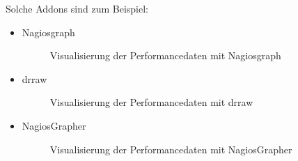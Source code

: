 Solche Addons sind zum Beispiel:
\begin{itemize}
\item Nagiosgraph 

\begin{figure}[ht]
	\centering
		\caption{Visualisierung der Performancedaten mit Nagiosgraph}
		\label{nagiosgraph}
\end{figure}

\item drraw

\begin{figure}[ht]
	\centering
		\caption{Visualisierung der Performancedaten mit drraw}
		\label{drraw}
\end{figure}

\newpage
\item NagiosGrapher

\begin{figure}[ht]
	\centering
		\caption{Visualisierung der Performancedaten mit NagiosGrapher}
		\label{nagios}
\end{figure}


\end{itemize}
